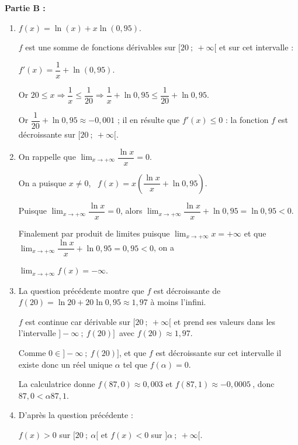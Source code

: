 \documentclass[10pt]{article}
\providecommand{\np}[2][]{{#2~#1}}
\begin{document}
\textbf{Partie B :}

\medskip

\begin{enumerate}
\item 

$f(x) = \ln (x) + x \ln (0,95)$.

$f$ est une somme de fonctions dérivables sur $[20~;~ +\infty[$ et sur cet intervalle :

$f'(x) = \dfrac{1}{x} + \ln (0,95)$.



Or $20 \leqslant x \Rightarrow \dfrac{1}{x} \leqslant \dfrac{1}{20} \Rightarrow \dfrac{1}{x} + \ln 0,95\leqslant \dfrac{1}{20} + \ln 0,95$.

Or $\dfrac{1}{20} + \ln 0,95 \approx - 0,001$ ; il en résulte que $f'(x) \leqslant 0$ : la fonction $f$ est décroissante sur $[20~;~ +\infty[$.
\item On rappelle que $\displaystyle\lim_{x \to + \infty} \dfrac{\ln x}{x} = 0$. 


On a puisque $x \ne 0$, \, $f(x) = x\left(\dfrac{\ln x}{x} + \ln 0,95 \right)$.

Puisque  $\displaystyle\lim_{x \to + \infty} \dfrac{\ln x}{x} = 0$, alors  $\displaystyle\lim_{x \to + \infty} \dfrac{\ln x}{x} + \ln 0,95 = \ln 0,95 < 0$.

Finalement par produit de limites puisque $\displaystyle\lim_{x \to + \infty} x = + \infty$ et que $\displaystyle\lim_{x \to + \infty} \dfrac{\ln x}{x} + \ln 0,95 = 0,95 < 0$, on a 

$\displaystyle\lim_{x \to + \infty}f(x) = - \infty$.
\item 
La question précédente montre que $f$ est décroissante de $f(20) = \ln 20 + 20\ln 0,95 \approx 1,97$ à moins l'infini.

$f$ est continue car dérivable sur $[20~;~ +\infty[$ et prend ses valeurs dans les l'intervalle 
$]- \infty~;~f(20)]$\, avec $f(20) \approx 1,97$.

Comme $0 \in ]- \infty~;~f(20)]$, et que $f$ est décroissante sur cet intervalle  il existe donc un réel unique $\alpha$ tel que $f(\alpha) = 0$.

La calculatrice donne $f(87,0) \approx 0,003$ et $f(87,1) \approx \np{- 0,0005}$, donc 
$87,0 < \alpha 87,1$.

\item 
D'après la question précédente :

$f(x) > 0$ sur $[20~;~\alpha[$ et $f(x) < 0$ sur $]\alpha~;~+ \infty[$. 
\end{enumerate}
\end{document}
